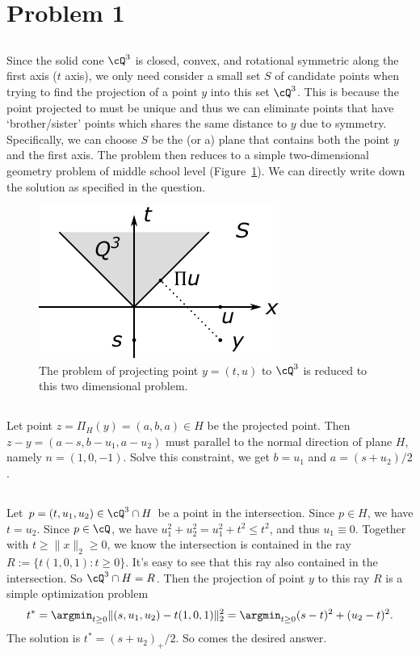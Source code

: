\section{Problem 1}

\subsection{} %

Since the solid cone $\cQ^3$ is closed, convex,
and rotational symmetric along the first axis ($t$ axis),
we only need consider a small set $S$ of candidate points
when trying to find the projection of a point $y$ into this set $\cQ^3$.
This is because the point projected to must be unique
and thus we can eliminate points that have `brother/sister' points which
shares the same distance to $y$ due to symmetry.
Specifically, we can choose $S$ be the (or a) plane that contains
both the point $y$ and the first axis.
The problem then reduces to a simple two-dimensional geometry problem
of middle school level (Figure~\ref{fig:1}).
We can directly write down the solution as specified in the question.

\begin{figure}[ht]
\centering
    \includegraphics[width=0.36\linewidth]{figure/fig1}
    \caption{\small
    The problem of projecting point $y=(t,u)$ to $\cQ^3$ is
    reduced to this two dimensional problem.}
    \label{fig:1}
\end{figure}

\subsection{} %

Let point $z=\Pi_H(y)=(a,b,a)\in H$ be the projected point.
Then $z-y=(a-s, b-u_1, a-u_2)$ must parallel to the normal direction of plane $H$,
namely $n=(1,0,-1)$.
Solve this constraint,
we get $b=u_1$ and $a=(s+u_2)/2$.

\subsection{} %

Let $p=(t,u_1,u_2)\in \cQ^3\cap H$ be a point in the intersection.
Since $p\in H$, we have $t=u_2$.
Since $p \in \cQ$, we have $u_1^2+u_2^2=u_1^2 + t^2\le t^2$,
and thus $u_1\equiv0$.
Together with $t\ge\|x\|_2\ge0$,
we know the intersection is contained in the ray $R:=\{t(1,0,1): t\ge0\}$.
It's easy to see that this ray also contained in the intersection.
So $\cQ^3\cap H=R$.
Then the projection of point $y$ to this ray $R$ is a simple optimization problem
\begin{equation}
    t^*=\argmin_{t\ge0}\|(s,u_1,u_2)-t(1,0,1)\|_2^2=\argmin_{t\ge0}(s-t)^2+(u_2-t)^2.
\end{equation}
The solution is $t^*=(s+u_2)_+/2$.
So comes the desired answer.

